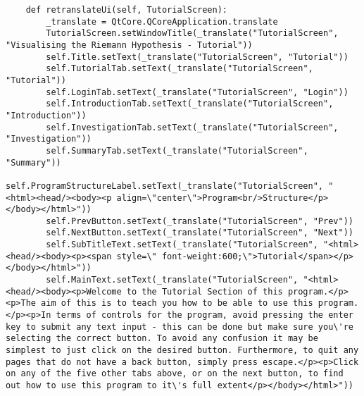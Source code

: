 \documentclass{article}
\begin{document}
\begin{lstlisting}
    def retranslateUi(self, TutorialScreen):
        _translate = QtCore.QCoreApplication.translate
        TutorialScreen.setWindowTitle(_translate("TutorialScreen", "Visualising the Riemann Hypothesis - Tutorial"))
        self.Title.setText(_translate("TutorialScreen", "Tutorial"))
        self.TutorialTab.setText(_translate("TutorialScreen", "Tutorial"))
        self.LoginTab.setText(_translate("TutorialScreen", "Login"))
        self.IntroductionTab.setText(_translate("TutorialScreen", "Introduction"))
        self.InvestigationTab.setText(_translate("TutorialScreen", "Investigation"))
        self.SummaryTab.setText(_translate("TutorialScreen", "Summary"))
        self.ProgramStructureLabel.setText(_translate("TutorialScreen", "<html><head/><body><p align=\"center\">Program<br/>Structure</p></body></html>"))
        self.PrevButton.setText(_translate("TutorialScreen", "Prev"))
        self.NextButton.setText(_translate("TutorialScreen", "Next"))
        self.SubTitleText.setText(_translate("TutorialScreen", "<html><head/><body><p><span style=\" font-weight:600;\">Tutorial</span></p></body></html>"))
        self.MainText.setText(_translate("TutorialScreen", "<html><head/><body><p>Welcome to the Tutorial Section of this program.</p><p>The aim of this is to teach you how to be able to use this program.</p><p>In terms of controls for the program, avoid pressing the enter key to submit any text input - this can be done but make sure you\'re selecting the correct button. To avoid any confusion it may be simplest to just click on the desired button. Furthermore, to quit any pages that do not have a back button, simply press escape.</p><p>Click on any of the five other tabs above, or on the next button, to find out how to use this program to it\'s full extent</p></body></html>"))
\end{lstlisting}
\end{document}
